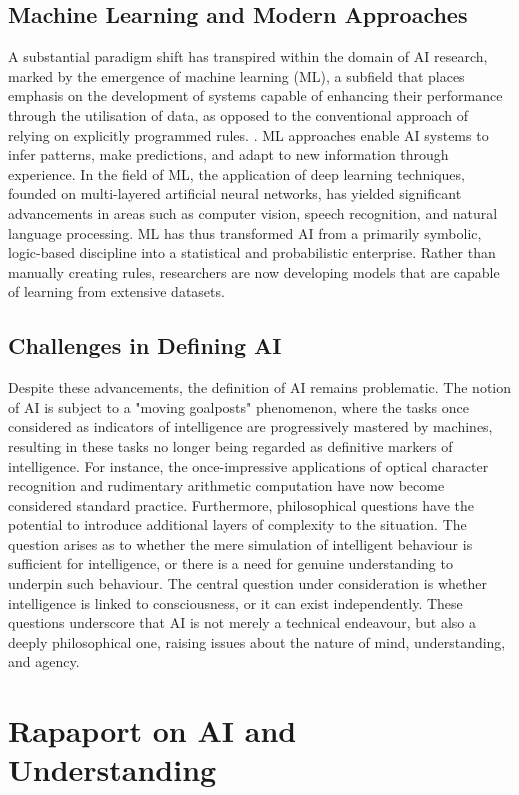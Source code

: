 \documentclass[runningheads]{llncs}
\begin{document}
\subsection{Machine Learning and Modern Approaches}
%
A substantial paradigm shift has transpired within the domain of AI research, marked by the emergence of machine learning (ML), a subfield that places emphasis on the development of systems capable of enhancing their performance through the utilisation of data, as opposed to the conventional approach of relying on explicitly programmed rules. \cite{goodfellow2016deep}. ML approaches enable AI systems to infer patterns, make predictions, and adapt to new information through experience. In the field of ML, the application of deep learning techniques, founded on multi-layered artificial neural networks, has yielded significant advancements in areas such as computer vision, speech recognition, and natural language processing. ML has thus transformed AI from a primarily symbolic, logic-based discipline into a statistical and probabilistic enterprise. Rather than manually creating rules, researchers are now developing models that are capable of learning from extensive datasets.
%
%
\subsection{Challenges in Defining AI}
%
Despite these advancements, the definition of AI remains problematic. The notion of AI is subject to a "moving goalposts" phenomenon, where the tasks once considered as indicators of intelligence are progressively mastered by machines, resulting in these tasks no longer being regarded as definitive markers of intelligence. For instance, the once-impressive applications of optical character recognition and rudimentary arithmetic computation have now become considered standard practice.
Furthermore, philosophical questions have the potential to introduce additional layers of complexity to the situation. The question arises as to whether the mere simulation of intelligent behaviour is sufficient for intelligence, or there is a need for genuine understanding to underpin such behaviour. The central question under consideration is whether intelligence is linked to consciousness, or it can exist independently. These questions underscore that AI is not merely a technical endeavour, but also a deeply philosophical one, raising issues about the nature of mind, understanding, and agency.
%
%
%
%
%
\section{Rapaport on AI and Understanding}
\end{document}
